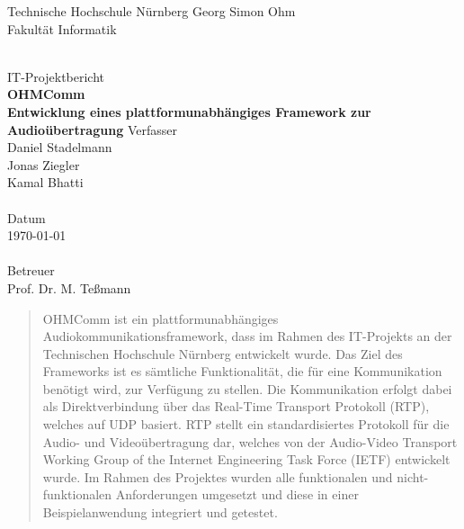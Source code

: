 \documentclass[11pt,a4paper]{report}
\begin{document}
\begin{titlepage}
  \begin{center}
    \parbox[t]{14cm}{
		\centering
      {\selectfont
			\Large
				Technische Hochschule Nürnberg Georg Simon Ohm \\
				Fakultät Informatik
			}
	}
	\\[3cm]
    \vfill    
    {\selectfont \huge IT-Projektbericht} \\[0.5cm]
    {\selectfont \LARGE \bfseries OHMComm \\ Entwicklung eines plattformunabhängiges Framework zur Audioübertragung}
    \vfill
    {
			\selectfont
      Verfasser \\ \large Daniel Stadelmann \\ Jonas Ziegler \\ Kamal Bhatti \\ \mbox{ } \\
      \normalsize Datum \\ \large \today \\ \mbox{ } \\
      \normalsize Betreuer \\ \large Prof. Dr. M. Teßmann \\
    } 
\end{center}
\end{titlepage}

\cleardoublepage

\begin{abstract} 
OHMComm ist ein plattformunabhängiges Audiokommunikationsframework, dass im Rahmen des IT-Projekts an der Technischen Hochschule Nürnberg entwickelt wurde. Das Ziel des Frameworks ist es sämtliche Funktionalität, die für eine Kommunikation benötigt wird, zur Verfügung zu stellen. Die Kommunikation erfolgt dabei als Direktverbindung über das Real-Time Transport Protokoll (RTP), welches auf UDP basiert. RTP stellt ein standardisiertes Protokoll für die Audio- und Videoübertragung dar, welches von der Audio-Video Transport Working Group of the Internet Engineering Task Force (IETF) entwickelt wurde. Im Rahmen des Projektes wurden alle funktionalen und nicht-funktionalen Anforderungen umgesetzt und diese in einer Beispielanwendung integriert und getestet.

\end{abstract}
\end{document}
